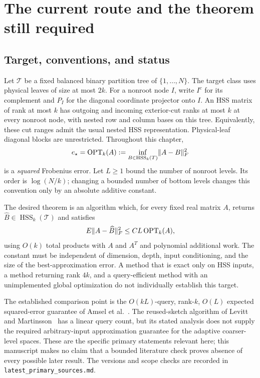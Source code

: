\documentclass[11pt,oneside,openany,a4paper]{report}
\numberwithin{equation}{chapter}
\theoremstyle{definition}
\theoremstyle{remark}
\newcommand{\sourcefile}[1]{{\small\nolinkurl{#1}}}
\DeclareMathOperator{\HSS}{HSS}\DeclareMathOperator{\dist}{dist}
\begin{document}
\begingroup\small
\tableofcontents
\endgroup
\clearpage
{}

\chapter{The current route and the theorem still required}
\label{chap:current-route}

\section{Target, conventions, and status}

Let $\mathcal T$ be a fixed balanced binary partition tree of
$\{1,\ldots,N\}$.  The target class uses physical leaves of size at most
$2k$.  For a nonroot node $I$, write $I^c$ for its complement and $P_I$ for
the diagonal coordinate projector onto $I$.  An HSS matrix of rank at most
$k$ has outgoing and incoming exterior-cut ranks at most $k$ at every
nonroot node, with nested row and column bases on this tree.  Equivalently,
these cut ranges admit the usual nested HSS representation.  Physical-leaf
diagonal blocks are unrestricted.  Throughout this chapter,
\[
 e_\star=\OPT_k(A):=
 \inf_{B\in\HSS_k(\mathcal T)}\lVert A-B\rVert_F^2
\]
is a \emph{squared} Frobenius error.  Let $L\geq1$ bound the number of
nonroot levels.  Its order is $\log(N/k)$; changing a bounded number of
bottom levels changes this convention only by an absolute additive
constant.

The desired theorem is an algorithm which, for every fixed real matrix
$A$, returns $\widehat B\in\HSS_k(\mathcal T)$ and satisfies
\begin{equation}
 E\lVert A-\widehat B\rVert_F^2\leq C L\operatorname{OPT}_k(A),
 \label{eq:route-target}
\end{equation}
using $O(k)$ total products with $A$ and $A^T$ and polynomial additional
work.  The constant must be independent of dimension, depth, input
conditioning, and the size of the best-approximation error.  A method that
is exact only on HSS inputs, a method returning rank $4k$, and a
query-efficient method with an unimplemented global optimization do not
individually establish this target.

The established comparison point is the $O(kL)$-query, rank-$k$,
$O(L)$ expected squared-error guarantee of Amsel et al.\ \cite{amsel2025}.
The reused-sketch algorithm of Levitt and Martinsson\ \cite{levitt2024} has a
linear query count, but its stated analysis does not supply the required
arbitrary-input approximation guarantee for the adaptive coarser-level
spaces.  These are the specific primary statements relevant here; this
manuscript makes no claim that a bounded literature check proves absence
of every possible later result.  The versions and scope checks are
recorded in \sourcefile{latest_primary_sources.md}.
\end{document}
